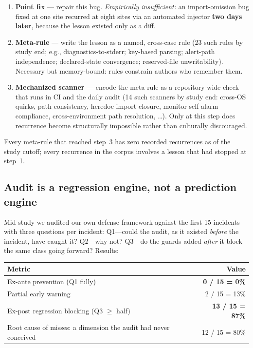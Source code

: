 \begin{enumerate}
\item \textbf{Point fix} --- repair this bug. \emph{Empirically
insufficient:} an import-omission bug fixed at one site recurred at eight
sites via an automated injector \textbf{two days later}, because the
lesson existed only as a diff.
\item \textbf{Meta-rule} --- write the lesson as a named, cross-case rule
(23 such rules by study end; e.g., diagnostics-to-stderr; key-based
parsing; alert-path independence; declared-state convergence;
reserved-file unwritability). Necessary but memory-bound: rules constrain
authors who remember them.
\item \textbf{Mechanized scanner} --- encode the meta-rule as a
repository-wide check that runs in CI and the daily audit (14 such
scanners by study end: cross-OS quirks, path consistency, heredoc import
closure, monitor self-alarm compliance, cross-environment path
resolution, \dots). Only at this step does recurrence become structurally
impossible rather than culturally discouraged.
\end{enumerate}

Every meta-rule that reached step~3 has zero recorded recurrences as of
the study cutoff; every recurrence in the corpus involves a lesson that
had stopped at step~1.

\subsection{Audit is a regression engine, not a prediction
engine}\label{sec:audit}

Mid-study we audited our own defense framework against the first 15
incidents with three questions per incident: Q1---could the audit, as it
existed \emph{before} the incident, have caught it? Q2---why not?
Q3---do the guards added \emph{after} it block the same class going
forward? Results:

\begin{center}\small
\begin{tabular}{@{}lr@{}}
\toprule
\textbf{Metric} & \textbf{Value} \\
\midrule
Ex-ante prevention (Q1 fully) & \textbf{0 / 15 = 0\%} \\
Partial early warning & 2 / 15 = 13\% \\
Ex-post regression blocking (Q3 $\geq$ half) & \textbf{13 / 15 = 87\%} \\
Root cause of misses: a dimension the audit had never conceived &
12 / 15 = 80\% \\
\bottomrule
\end{tabular}
\end{center}

